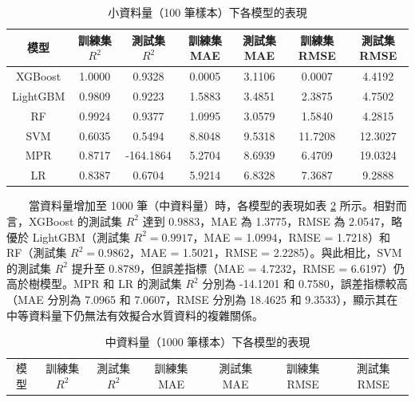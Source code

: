 \documentclass[12pt,a4paper]{article}
\begin{document}
\begin{enumerate}
\begin{enumerate}[label=\arabic*.]
\begin{enumerate}[label=3-2-\arabic*.]
\begin{enumerate}[label=\Alph*.]
\begin{table}[H]
                        \centering
                        \caption{小資料量（100 筆樣本）下各模型的表現}
                        \label{table:small_data}
                        \begin{tabular}{|c|c|c|c|c|c|c|}
                            \hline
                            模型 & 訓練集 \( R^2 \) & 測試集 \( R^2 \) & 訓練集 MAE & 測試集 MAE & 訓練集 RMSE & 測試集 RMSE \\
                            \hline
                            XGBoost & 1.0000 & 0.9328 & 0.0005 & 3.1106 & 0.0007 & 4.4192 \\
                            LightGBM & 0.9809 & 0.9223 & 1.5883 & 3.4851 & 2.3875 & 4.7502 \\
                            RF & 0.9924 & 0.9377 & 1.0995 & 3.0579 & 1.5840 & 4.2815 \\
                            SVM & 0.6035 & 0.5494 & 8.8048 & 9.5318 & 11.7208 & 12.3027 \\
                            MPR & 0.8717 & -164.1864 & 5.2704 & 8.6939 & 6.4709 & 19.0324 \\
                            LR & 0.8387 & 0.6704 & 5.9214 & 6.8328 & 7.3687 & 9.2888 \\
                            \hline
                        \end{tabular}
                    \end{table}
                　　當資料量增加至 1000 筆（中資料量）時，各模型的表現如表 \ref{table:medium_data_1000} 所示。相對而言，XGBoost 的測試集 \( R^2 \) 達到 0.9883，MAE 為 1.3775，RMSE 為 2.0547，略優於 LightGBM（測試集 \( R^2 = 0.9917 \)，MAE = 1.0994，RMSE = 1.7218）和 RF（測試集 \( R^2 = 0.9862 \)，MAE = 1.5021，RMSE = 2.2285）。與此相比，SVM 的測試集 \( R^2 \) 提升至 0.8789，但誤差指標（MAE = 4.7232，RMSE = 6.6197）仍高於樹模型。MPR 和 LR 的測試集 \( R^2 \) 分別為 -14.1201 和 0.7580，誤差指標較高（MAE 分別為 7.0965 和 7.0607，RMSE 分別為 18.4625 和 9.3533），顯示其在中等資料量下仍無法有效擬合水質資料的複雜關係。\\
                    \begin{table}[H]
                        \centering
                        \caption{中資料量（1000 筆樣本）下各模型的表現}
                        \label{table:medium_data_1000}
                        \begin{tabular}{|c|c|c|c|c|c|c|}
                            \hline
                            模型 & 訓練集 \( R^2 \) & 測試集 \( R^2 \) & 訓練集 MAE & 測試集 MAE & 訓練集 RMSE & 測試集 RMSE \\

\end{tabular}
\end{table}
\end{enumerate}
\end{enumerate}
\end{enumerate}
\end{enumerate}
\end{document}
